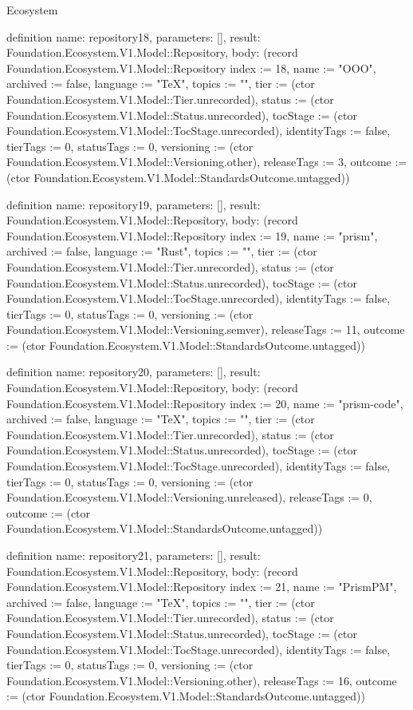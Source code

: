 \begin{lexlean}{Ecosystem}
\begin{semanticmodule}
definition{
  name: repository18,
  parameters: [],
  result: Foundation.Ecosystem.V1.Model::Repository,
  body: (record Foundation.Ecosystem.V1.Model::Repository {index := 18, name := "OOO", archived := false, language := "TeX", topics := "", tier := (ctor Foundation.Ecosystem.V1.Model::Tier.unrecorded), status := (ctor Foundation.Ecosystem.V1.Model::Status.unrecorded), tocStage := (ctor Foundation.Ecosystem.V1.Model::TocStage.unrecorded), identityTags := false, tierTags := 0, statusTags := 0, versioning := (ctor Foundation.Ecosystem.V1.Model::Versioning.other), releaseTags := 3, outcome := (ctor Foundation.Ecosystem.V1.Model::StandardsOutcome.untagged)})
}

definition{
  name: repository19,
  parameters: [],
  result: Foundation.Ecosystem.V1.Model::Repository,
  body: (record Foundation.Ecosystem.V1.Model::Repository {index := 19, name := "prism", archived := false, language := "Rust", topics := "", tier := (ctor Foundation.Ecosystem.V1.Model::Tier.unrecorded), status := (ctor Foundation.Ecosystem.V1.Model::Status.unrecorded), tocStage := (ctor Foundation.Ecosystem.V1.Model::TocStage.unrecorded), identityTags := false, tierTags := 0, statusTags := 0, versioning := (ctor Foundation.Ecosystem.V1.Model::Versioning.semver), releaseTags := 11, outcome := (ctor Foundation.Ecosystem.V1.Model::StandardsOutcome.untagged)})
}

definition{
  name: repository20,
  parameters: [],
  result: Foundation.Ecosystem.V1.Model::Repository,
  body: (record Foundation.Ecosystem.V1.Model::Repository {index := 20, name := "prism-code", archived := false, language := "TeX", topics := "", tier := (ctor Foundation.Ecosystem.V1.Model::Tier.unrecorded), status := (ctor Foundation.Ecosystem.V1.Model::Status.unrecorded), tocStage := (ctor Foundation.Ecosystem.V1.Model::TocStage.unrecorded), identityTags := false, tierTags := 0, statusTags := 0, versioning := (ctor Foundation.Ecosystem.V1.Model::Versioning.unreleased), releaseTags := 0, outcome := (ctor Foundation.Ecosystem.V1.Model::StandardsOutcome.untagged)})
}

definition{
  name: repository21,
  parameters: [],
  result: Foundation.Ecosystem.V1.Model::Repository,
  body: (record Foundation.Ecosystem.V1.Model::Repository {index := 21, name := "PrismPM", archived := false, language := "TeX", topics := "", tier := (ctor Foundation.Ecosystem.V1.Model::Tier.unrecorded), status := (ctor Foundation.Ecosystem.V1.Model::Status.unrecorded), tocStage := (ctor Foundation.Ecosystem.V1.Model::TocStage.unrecorded), identityTags := false, tierTags := 0, statusTags := 0, versioning := (ctor Foundation.Ecosystem.V1.Model::Versioning.other), releaseTags := 16, outcome := (ctor Foundation.Ecosystem.V1.Model::StandardsOutcome.untagged)})
}


\end{semanticmodule}
\end{lexlean}
